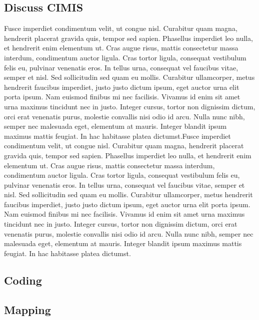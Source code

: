 \documentclass[letterpaper]{article}
\begin{document}
\subsection {Discuss CIMIS}

Fusce imperdiet condimentum velit, ut congue nisl. Curabitur quam magna, hendrerit placerat gravida quis, tempor sed sapien. Phasellus imperdiet leo nulla, et hendrerit enim elementum ut. Cras augue risus, mattis consectetur massa interdum, condimentum auctor ligula. Cras tortor ligula, consequat vestibulum felis eu, pulvinar venenatis eros. In tellus urna, consequat vel faucibus vitae, semper et nisl. Sed sollicitudin sed quam eu mollis. Curabitur ullamcorper, metus hendrerit faucibus imperdiet, justo justo dictum ipsum, eget auctor urna elit porta ipsum. Nam euismod finibus mi nec facilisis. Vivamus id enim sit amet urna maximus tincidunt nec in justo. Integer cursus, tortor non dignissim dictum, orci erat venenatis purus, molestie convallis nisi odio id arcu. Nulla nunc nibh, semper nec malesuada eget, elementum at mauris. Integer blandit ipsum maximus mattis feugiat. In hac habitasse platea dictumst.Fusce imperdiet condimentum velit, ut congue nisl. Curabitur quam magna, hendrerit placerat gravida quis, tempor sed sapien. Phasellus imperdiet leo nulla, et hendrerit enim elementum ut. Cras augue risus, mattis consectetur massa interdum, condimentum auctor ligula. Cras tortor ligula, consequat vestibulum felis eu, pulvinar venenatis eros. In tellus urna, consequat vel faucibus vitae, semper et nisl. Sed sollicitudin sed quam eu mollis. Curabitur ullamcorper, metus hendrerit faucibus imperdiet, justo justo dictum ipsum, eget auctor urna elit porta ipsum. Nam euismod finibus mi nec facilisis. Vivamus id enim sit amet urna maximus tincidunt nec in justo. Integer cursus, tortor non dignissim dictum, orci erat venenatis purus, molestie convallis nisi odio id arcu. Nulla nunc nibh, semper nec malesuada eget, elementum at mauris. Integer blandit ipsum maximus mattis feugiat. In hac habitasse platea dictumst.
\subsection{Coding}
\subsection{Mapping}
\end{document}
